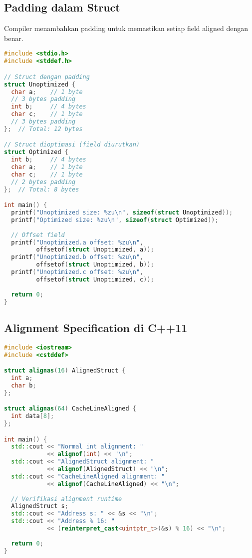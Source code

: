 \documentclass[../main.tex]{subfiles}
\begin{document}
\subsection{Padding dalam Struct}
Compiler menambahkan padding untuk memastikan setiap field aligned dengan benar.

\begin{lstlisting}[language=C, caption={Padding dalam struct}]
#include <stdio.h>
#include <stddef.h>

// Struct dengan padding
struct Unoptimized {
  char a;    // 1 byte
  // 3 bytes padding
  int b;     // 4 bytes
  char c;    // 1 byte
  // 3 bytes padding
};  // Total: 12 bytes

// Struct dioptimasi (field diurutkan)
struct Optimized {
  int b;     // 4 bytes
  char a;    // 1 byte
  char c;    // 1 byte
  // 2 bytes padding
};  // Total: 8 bytes

int main() {
  printf("Unoptimized size: %zu\n", sizeof(struct Unoptimized));
  printf("Optimized size: %zu\n", sizeof(struct Optimized));
  
  // Offset field
  printf("Unoptimized.a offset: %zu\n", 
         offsetof(struct Unoptimized, a));
  printf("Unoptimized.b offset: %zu\n", 
         offsetof(struct Unoptimized, b));
  printf("Unoptimized.c offset: %zu\n", 
         offsetof(struct Unoptimized, c));
  
  return 0;
}
\end{lstlisting}

\subsection{Alignment Specification di C++11}
\begin{lstlisting}[language=C++, caption={alignas dan alignof di C++11}]
#include <iostream>
#include <cstddef>

struct alignas(16) AlignedStruct {
  int a;
  char b;
};

struct alignas(64) CacheLineAligned {
  int data[8];
};

int main() {
  std::cout << "Normal int alignment: " 
            << alignof(int) << "\n";
  std::cout << "AlignedStruct alignment: " 
            << alignof(AlignedStruct) << "\n";
  std::cout << "CacheLineAligned alignment: " 
            << alignof(CacheLineAligned) << "\n";
  
  // Verifikasi alignment runtime
  AlignedStruct s;
  std::cout << "Address s: " << &s << "\n";
  std::cout << "Address % 16: " 
            << (reinterpret_cast<uintptr_t>(&s) % 16) << "\n";
  
  return 0;
}
\end{lstlisting}
\end{document}
